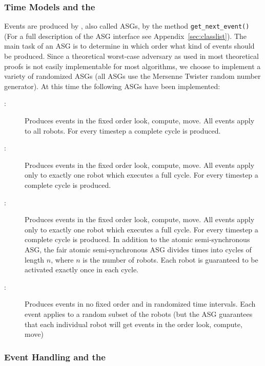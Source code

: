 \subsubsection{Time Models and the }

Events are produced by , also called ASGs, by the method \texttt{get\_next\_event()} (For a full description of the ASG interface see Appendix~\ref{sec:classlist}). The main task of an ASG is to determine in which order what kind of events should be produced. Since a theoretical worst-case adversary as used in most theoretical proofs is not easily implementable for most algorithms, we choose to implement a variety of randomized ASGs (all ASGs use the Mersenne Twister \cite{reference:mersenne} random number generator). At this time the following ASGs have been implemented:

\begin{description}
\item[:] Produces events in the fixed order look, compute, move. All events apply to all robots. For every timestep a complete \LCM cycle is produced.
\item[:] Produces events in the fixed order look, compute, move. All events apply only to exactly one robot which executes a full \LCM cycle. For every timestep a complete \LCM cycle is produced.
\item[:] Produces events in the fixed order look, compute, move. All events apply only to exactly one robot which executes a full \LCM cycle. For every timestep a complete \LCM cycle is produced. In addition to the atomic semi-synchronous ASG, the fair atomic semi-synchronous ASG divides times into cycles of length $n$, where $n$ is the number of robots. Each robot is guaranteed to be activated exactly once in each cycle.
\item[:] Produces events in no fixed order and in randomized time intervals. Each event applies to a random subset of the robots (but the ASG guarantees that each individual robot will get events in the order look, compute, move) 
\end{description}

\subsubsection{Event Handling and the }

